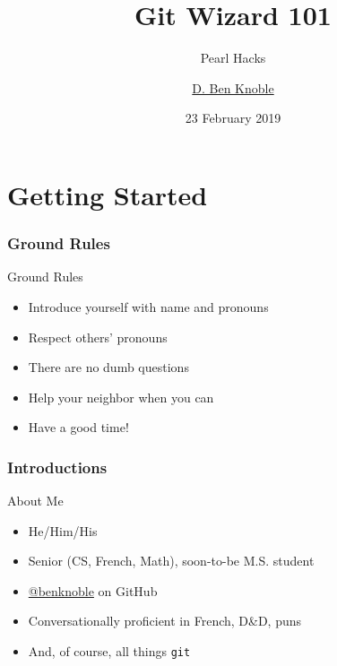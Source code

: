 \documentclass{beamer}
\title{Git Wizard 101}
\subtitle{Pearl Hacks}
\author{\href{https://benknoble.github.io}{D. Ben Knoble}}
\institute{UNC Chapel Hill}
\date{23 February 2019}
\theoremstyle{example}
\begin{document}

\frame[label=title]{\titlepage}

\part{Getting Started}
\frame{\partpage}
\frame{\tableofcontents[part=1]}

\section{Ground Rules}
\begin{frame}{Ground Rules}
    \begin{itemize}
        \item Introduce yourself with name and pronouns
        \item Respect others' pronouns
        \item There are no dumb questions
        \item Help your neighbor when you can
        \item Have a good time!
    \end{itemize}
\end{frame}

\section{Introductions}
\begin{frame}{About Me}
    \begin{itemize}
        \item He/Him/His
        \item Senior (CS, French, Math), soon-to-be M.S. student
        \item \href{https://github.com/benknoble}{@benknoble} on GitHub
        \item<2-> Conversationally proficient in French, D\&D, puns
        \item<3-> And, of course, all things \texttt{git}
    \end{itemize}
\end{frame}
\end{document}
